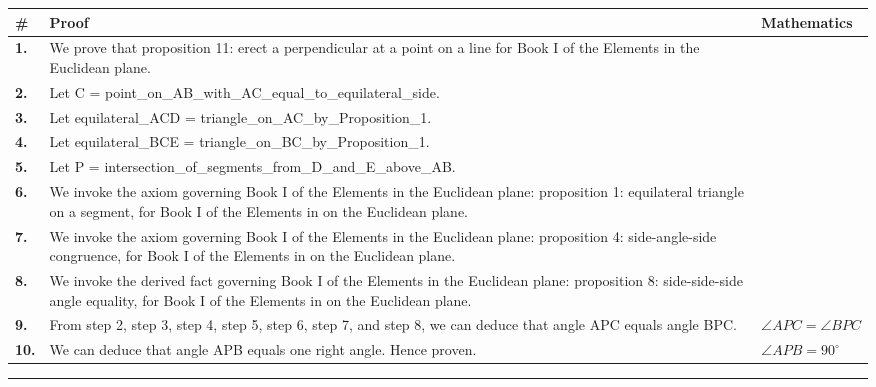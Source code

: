 \documentclass[11pt]{article}
\theoremstyle{definition}
\begin{document}
\begin{tabular}{@{} >{\raggedright\arraybackslash}p{} >{\raggedright\arraybackslash}p{} >{\raggedleft\arraybackslash}p{} @{}}
\textbf{\#} & \textbf{Proof} & \textbf{Mathematics} \\
\midrule
\textbf{1.} & We prove that proposition 11: erect a perpendicular at a point on a line for Book I of the Elements in the Euclidean plane. & \\[0.45em]
\textbf{2.} & Let C = point\_on\_AB\_with\_AC\_equal\_to\_equilateral\_side. & \\[0.45em]
\textbf{3.} & Let equilateral\_ACD = triangle\_on\_AC\_by\_Proposition\_1. & \\[0.45em]
\textbf{4.} & Let equilateral\_BCE = triangle\_on\_BC\_by\_Proposition\_1. & \\[0.45em]
\textbf{5.} & Let P = intersection\_of\_segments\_from\_D\_and\_E\_above\_AB. & \\[0.45em]
\textbf{6.} & We invoke the axiom governing Book I of the Elements in the Euclidean plane: proposition 1: equilateral triangle on a segment, for Book I of the Elements in on the Euclidean plane. & \\[0.45em]
\textbf{7.} & We invoke the axiom governing Book I of the Elements in the Euclidean plane: proposition 4: side-angle-side congruence, for Book I of the Elements in on the Euclidean plane. & \\[0.45em]
\textbf{8.} & We invoke the derived fact governing Book I of the Elements in the Euclidean plane: proposition 8: side-side-side angle equality, for Book I of the Elements in on the Euclidean plane. & \\[0.45em]
\textbf{9.} & From step 2, step 3, step 4, step 5, step 6, step 7, and step 8, we can deduce that angle APC equals angle BPC. & $\displaystyle \angle APC = \angle BPC$ \\[0.45em]
\textbf{10.} & We can deduce that angle APB equals one right angle. Hence proven. & $\displaystyle \angle APB = 90^\circ$ \\[0.45em]
\bottomrule
\end{tabular}
\label{thm:Geometry-Euclid Book I-proposition_11_erect_a_perpendicular_at_a_point_on_a_line}
\par\medskip\hrule
\end{document}
